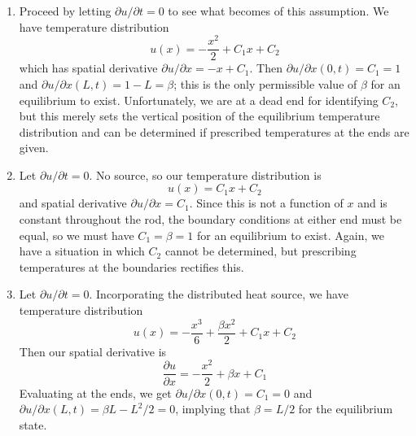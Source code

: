 \documentclass[a4paper]{article}
\begin{document}
\begin{enumerate}[label=(\alph*)]
	\item Proceed by letting \( \partial u / \partial t = 0 \) to see what becomes of this assumption. We have temperature distribution
	\[
		u \!\left( x \right) = -\frac{x^{2}}{2} + C_{1}x + C_{2} 
	\]
	which has spatial derivative \( \partial u / \partial x = -x + C_{1} \). Then \( \partial u / \partial x \!\left( 0,t \right) = C_{1} = 1 \) and \( \partial u / \partial x \!\left( L,t \right) = 1 - L = \beta \); this is the only permissible value of \( \beta \) for an equilibrium to exist. Unfortunately, we are at a dead end for identifying \( C_{2} \), but this merely sets the vertical position of the equilibrium temperature distribution and can be determined if prescribed temperatures at the ends are given.
	\item Let \( \partial u / \partial t = 0 \). No source, so our temperature distribution is
	\[
		u \!\left( x \right) = C_{1}x + C_{2} 
	\]
	and spatial derivative \( \partial u / \partial x = C_{1} \). Since this is not a function of \( x \) and is constant throughout the rod, the boundary conditions at either end must be equal, so we must have \( C_{1} = \beta = 1 \) for an equilibrium to exist. Again, we have a situation in which \( C_{2} \) cannot be determined, but prescribing temperatures at the boundaries rectifies this.
	\item Let \( \partial u / \partial t = 0 \). Incorporating the distributed heat source, we have temperature distribution
	\[
		u \!\left( x \right) = -\frac{x^{3}}{6} + \frac{\beta x^{2}}{2} + C_{1}x + C_{2} 
	\]
	Then our spatial derivative is 
	\[
		\frac{\partial u}{\partial x} = -\frac{x^{2}}{2} + \beta x + C_{1} 
	\]
	Evaluating at the ends, we get \( \partial u / \partial x \!\left( 0,t \right) = C_{1} = 0 \) and \( \partial u / \partial x \!\left( L,t \right) = \beta L - L^{2} / 2 = 0 \), implying that \( \beta = L / 2 \) for the equilibrium state.
\end{enumerate}

\end{document}
